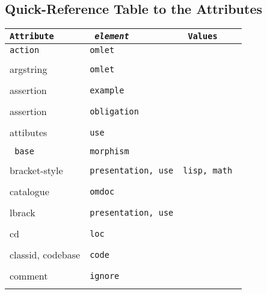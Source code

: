 \begin{appendix}
\chapter{Quick-Reference Table to the {\omdoc} Attributes}\label{sec:att-table}
\def\atabelt#1#2#3#4{{#1}&{#2}&{#3}\\\hline&\multicolumn{2}{|p{9cm}|}{#4}\\\hline\hline}
{\footnotesize\begin{longtable}{|>{\tt}p{2.5cm}|>{\tt}p{4cm}|>{\tt}p{5cm}|}\hline
{\rm Attribute} & {\em element} & Values \\\hline\hline
\atabelt{action}{omlet}{}
 {specifies the action to be taken when executing the {\tt{omlet}}, the value is
     application-defined.}

\atabelt{argstring}{omlet}{}
 {specifies the argument string for the function specified in the {\tt{function}}
 attribute of  this {\tt{omlet}}}

\atabelt{assertion}{example}{}
 {specifies the assertion that states that the objects given in the example really have
   the expected properties.}

\atabelt{assertion}{obligation}{}
 {specifies the assertion that states that the translation of the statement in the
  source theory specified by the {\tt{induced-by}} attribute is valid in the
  target theory.}

\atabelt{attibutes}{use}{}
 {the attribute string for the start tag of the {\xml} element  substituted for
 the brackets (this is specified in the {\tt{element}} attribute).}
\atabelt{base}{morphism}{}
 {specifies another morphism that should be used as a base for expansion in the
  definition of this morphism}

\atabelt{bracket-style}{presentation, use}{lisp, math  }
 {specifies whether a function application is of the form $f(a,b)$ or $(f a b)$}

\atabelt{catalogue}{omdoc}{}
 {specifies an outside {\omdoc} document that contais catalogue information for
   this one.}

\atabelt{lbrack}{presentation, use}{}
 {the left bracket to use in the notation of a function symbol}

\atabelt{cd}{loc}{}
 {specifies the location of the content dictionary for a theory}

\atabelt{classid, codebase}{code}{}
 {points to a class identifier and codebase, if the {\tt{code}} contains Java.}

\atabelt{comment}{ignore}{}
 {specifies a reason why we want to ignore the contents}


\end{longtable}}
\end{appendix}
